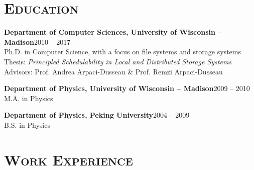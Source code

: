 \documentclass[10pt, letterpaper]{article}
\renewenvironment{itemize}{
  \begin{list}{}{
    \setlength{\leftmargin}{1.2em}
    \setlength{\itemsep}{0.12em}
    \setlength{\parskip}{0pt}
    \setlength{\parsep}{0.12em}
  }
}{
  \end{list}
}
\begin{document}
\section*{\textsc{Education}}
\begin{itemize}
  \item {\bf Department of Computer Sciences, University of Wisconsin -- Madison}\hfill 2010 --  2017\\
    Ph.D. in Computer Science, with a focus on file systems and storage systems\\
    Thesis: {\it Principled Schedulability in Local and Distributed Storage Systems}\\
    Advisors: { Prof. Andrea Arpaci-Dusseau \& Prof. Remzi Arpaci-Dusseau}%

  \item {\bf Department of Physics, University of Wisconsin -- Madison}\hfill 2009 -- 2010\\
    M.A. in Physics %

  \item {\bf Department of Physics, Peking University}\hfill 2004 -- 2009\\
    B.S. in Physics
\end{itemize}

\section*{\textsc{Work Experience}}
\end{document}
